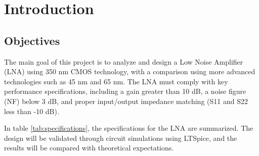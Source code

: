 \section{Introduction}

\subsection{Objectives}

The main goal of this project is to analyze and design a Low Noise Amplifier (LNA) using 350 nm CMOS technology, with a comparison using more advanced technologies such as 45 nm and 65 nm. The LNA must comply with key performance specifications, including a gain greater than 10 dB, a noise figure (NF) below 3 dB, and proper input/output impedance matching (S11 and S22 less than -10 dB).

In table \ref{tab:specifications}, the specifications for the LNA are summarized. The design will be validated through circuit simulations using LTSpice, and the results will be compared with theoretical expectations.

